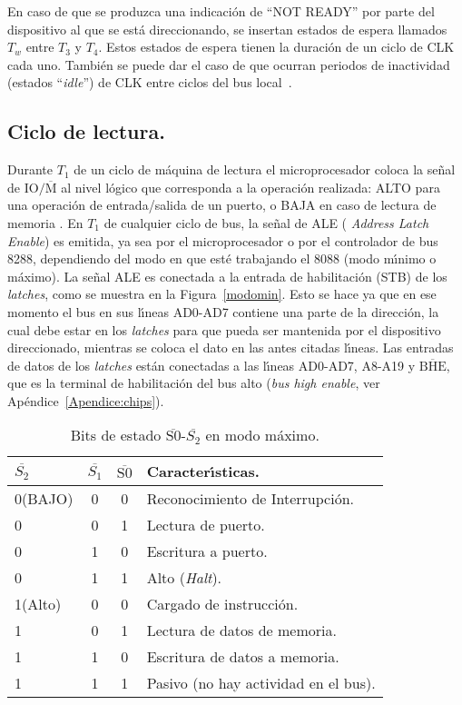 En caso de que se produzca una indicaci\'on de ``NOT READY'' por parte del dispositivo al que se %
est\'a direccionando, se insertan estados de espera llamados $T_{w}$ entre $T_{3}$ y $T_{4}$. %
Estos estados de espera tienen la duraci\'on de un ciclo de CLK cada uno. Tambi\'en se puede %
dar el caso de que ocurran periodos de inactividad (estados ``{\em idle\/}'') de CLK entre %
ciclos del bus local~\cite{Intel:Micro}.


\subsection{Ciclo de lectura.}
\label{Subsection:ciclolectura}

Durante $T_{1}$ de un ciclo de m\'aquina de lectura el microprocesador coloca la se\~nal de %
$\mbox{IO}/\overline{\mbox{M}}$ al nivel l\'ogico que corresponda a la operaci\'on %
realizada: ALTO para una operaci\'on de entrada/salida de un puerto, o BAJA en caso de lectura %
de memoria \cite{Hall}. En $T_{1}$ de cualquier ciclo de bus, la se\~nal de ALE ({\em %
Address Latch Enable\/}) es emitida, ya sea por el microprocesador o por el controlador de bus %
8288, dependiendo del modo en que est\'e trabajando el 8088 (modo m\'{\i}nimo o m\'aximo). La %
se\~nal ALE es conectada a la entrada de habilitaci\'on (STB) de los {\em latches\/}, como se %
muestra en la Figura~\ref{modomin}. Esto se hace ya que en ese momento el bus en sus %
l\'{\i}neas AD0-AD7 contiene una parte de la direcci\'on, la cual debe estar en los {\it %
latches} para que pueda ser mantenida por el dispositivo direccionado, mientras se coloca el %
dato en las antes citadas l\'{\i}neas. Las entradas de datos de los {\em latches} est\'an %
conectadas a las l\'{\i}neas AD0-AD7, A8-A19 y $\overline{\mbox{BHE}}$, que es la terminal %
de habilitaci\'on del bus alto ({\em bus high enable}, ver Ap\'endice~\ref{Apendice:chips}).

\begin{table}[!htb]
\centering
\begin{tabular}{|l|c|c|l|} \hline
$\overline{S_{2}}$ & $\overline{S_{1}}$ & $\overline{\mbox{S0}}$ & %
Caracter\'{\i}sticas. \\ \hline
0(BAJO) & 0 & 0 & Reconocimiento de Interrupci\'on. \\
0       & 0 & 1 & Lectura de puerto. \\
0       & 1 & 0 & Escritura a puerto. \\
0       & 1 & 1 & Alto ({\em Halt}). \\
1(Alto) & 0 & 0 & Cargado de instrucci\'on. \\
1       & 0 & 1 & Lectura de datos de memoria. \\
1       & 1 & 0 & Escritura de datos a memoria. \\
1       & 1 & 1 & Pasivo (no hay actividad en el bus). \\ \hline
\end{tabular}
\caption{Bits de estado $\overline{\mbox{S0}}$-$\overline{S_{2}}$ en modo m\'aximo.}
\label{statusbits1}
\end{table}

